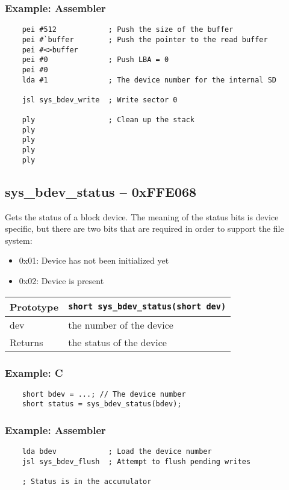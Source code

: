 \subsubsection*{Example: Assembler}
\begin{verbatim}
    pei #512			; Push the size of the buffer
    pei #`buffer		; Push the pointer to the read buffer
    pei #<>buffer
    pei #0				; Push LBA = 0
    pei #0
    lda #1				; The device number for the internal SD

    jsl sys_bdev_write	; Write sector 0

    ply					; Clean up the stack
    ply
    ply
    ply
    ply
\end{verbatim}

\subsection*{sys\_bdev\_status -- 0xFFE068}
Gets the status of a block device. The meaning of the status bits is device specific, but there are two bits that are required in order to support the file system:
\begin{itemize}
    \item 0x01: Device has not been initialized yet
    \item 0x02: Device is present
\end{itemize}

\bigskip

\begin{tabular}{|l||l|} \hline
Prototype & \lstinline!short sys_bdev_status(short dev)! \\ \hline
dev & the number of the device \\ \hline
Returns & the status of the device \\ \hline
\end{tabular}

\subsubsection*{Example: C}
\begin{lstlisting}
    short bdev = ...; // The device number
    short status = sys_bdev_status(bdev);
\end{lstlisting}

\subsubsection*{Example: Assembler}
\begin{verbatim}
    lda bdev            ; Load the device number
    jsl sys_bdev_flush  ; Attempt to flush pending writes

    ; Status is in the accumulator
\end{verbatim}


